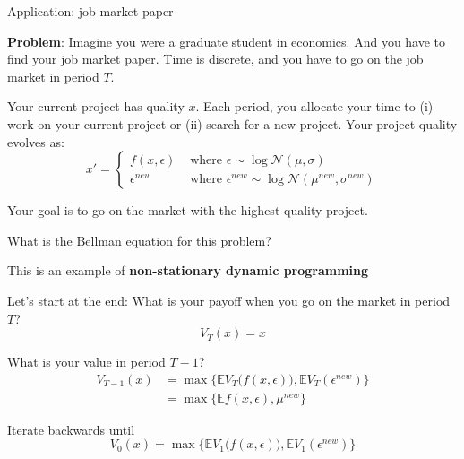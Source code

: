 \documentclass[11pt, aspectratio=169]{beamer}
\newenvironment{witemize}{\itemize\addtolength{\itemsep}{10pt}}{\enditemize}
\begin{document}
\begin{frame}{Application: job market paper}

\textbf{Problem}: Imagine you were a graduate student in economics. And you have to find your job market paper. Time is discrete, and you have to go on the job market in period $T$. 

\pause
\vspace{3mm}
Your current project has quality $x$. Each period, you allocate your time to (i) work on your current project or (ii) search for a new project. Your project quality evolves as:
\pause
\begin{equation*}
	x' = 
	\begin{cases}
		f(x, \epsilon) & \text{ where } \epsilon \sim \log \mathcal N(\mu, \sigma)  \\
		\epsilon^{new} &\text{ where } \epsilon^{new} \sim \log \mathcal N(\mu^{new}, \sigma^{new})
	\end{cases}
\end{equation*}

Your goal is to go on the market with the highest-quality project. 

\pause
\vspace{5mm}
What is the Bellman equation for this problem?

\end{frame}


\begin{frame}{}

\begin{witemize}
\item This is an example of \textbf{non-stationary dynamic programming}

\item Let's start at the end: What is your payoff when you go on the market in period $T$?
\begin{equation*}
	V_T(x) = x
\end{equation*}

\item What is your value in period $T-1$?
\begin{align*}
	V_{T-1}(x) 
	&= \max \Big\{\mathbb E V_T\Big( f(x, \epsilon)\Big) , \mathbb E V_T(\epsilon^{new}) \Big\} \\
	&= \max \Big\{\mathbb E f(x, \epsilon), \mu^{new} \Big\}
\end{align*}

\item Iterate backwards until 
\begin{equation*}
	V_0(x) = \max \Big\{\mathbb E V_1\Big( f(x, \epsilon)\Big) , \mathbb E V_1(\epsilon^{new}) \Big\} 
\end{equation*}
\end{witemize}
\end{frame}
\end{document}
